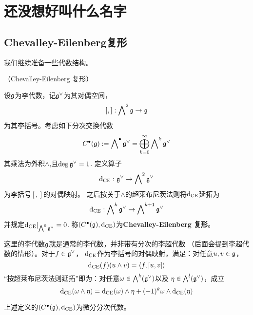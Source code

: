 
\chapter{还没想好叫什么名字}

\section{Chevalley-Eilenberg复形}
我们继续准备一些代数结构。
\begin{definition}（Chevalley-Eilenberg 复形）

设$\mathfrak{g}$为李代数，记$\mathfrak{g}^\vee$为其对偶空间，
$$[,]:\bigwedge\nolimits^{2}\mathfrak{g}\to\mathfrak{g}$$
为其李括号。考虑如下分次交换代数
$$C^{\bullet}(\mathfrak{g}):=\bigwedge\nolimits^{\bullet}\mathfrak{g}^\vee
=\bigoplus_{k=0}^\infty\bigwedge\nolimits^{k}\mathfrak{g}^\vee$$
其乘法为外积$\wedge$,且$\deg\mathfrak{g}^\vee =1$.
定义算子
$$\mathrm{d}_{\operatorname{CE}}:\mathfrak{g}^\vee\to\bigwedge\nolimits^{2}\mathfrak{g}^\vee$$
为李括号$[,]$的对偶映射。
之后按关于$\wedge$的超莱布尼茨法则将$\mathrm{d}_{\operatorname{CE}}$延拓为
$$\mathrm{d}_{\operatorname{CE}}:\bigwedge\nolimits^{k}\mathfrak{g}^\vee\to\bigwedge\nolimits^{k+1}\mathfrak{g}^\vee$$
并规定$\mathrm{d}_{\operatorname{CE}}|_{\bigwedge\nolimits^{0}\mathfrak{g}^\vee}=0$.
称$(C^{\bullet}(\mathfrak{g}),\mathrm{d}_{\operatorname{CE}})$为\textbf{Chevalley-Eilenberg 复形}。
\label{Chevalley-Elienberg复形-李代数版本-def}
\end{definition}



这里的李代数$\mathfrak{g}$就是通常的李代数，并非带有分次的李超代数
（后面会提到李超代数的情形）。对于$f\in\mathfrak{g}^\vee$，
$\mathrm{d}_{\operatorname{CE}}$作为李括号的对偶映射，满足：对任意$u,v\in\mathfrak{g}$，
$$\mathrm{d}_{\operatorname{CE}}(f)(u\wedge v)=\langle f,[u,v] \rangle$$
“按超莱布尼茨法则延拓”即为：对任意$\omega\in\bigwedge\nolimits^{k}(\mathfrak{g}^\vee)$以及
$\eta\in\bigwedge\nolimits^{l}(\mathfrak{g}^\vee)$，成立
$$
  \mathrm{d}_{\operatorname{CE}}(\omega\wedge\eta)
= \mathrm{d}_{\operatorname{CE}}(\omega)\wedge\eta
 +(-1)^{k}\omega\wedge\mathrm{d}_{\operatorname{CE}}(\eta)
$$

\begin{prop}
上述定义的$(C^{\bullet}(\mathfrak{g}),\mathrm{d}_{\operatorname{CE}})$为微分分次代数。
\label{Chevalley-Elienberg复形-微分分次代数-prop}
\end{prop}


